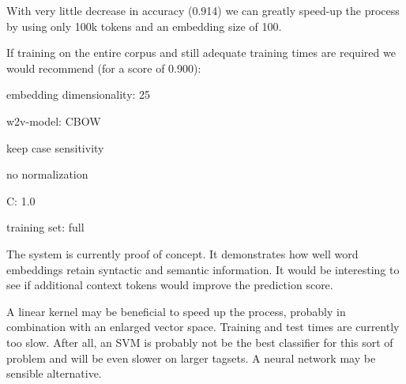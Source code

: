 \documentclass[11pt,a4paper]{article}
\begin{document}
With very little decrease in accuracy (0.914) we can greatly speed-up the process by using only 100k tokens and an embedding size of 100.

If training on the entire corpus and still adequate training times are required we would recommend (for a score of 0.900):
\begin{itemize*}
	\item embedding dimensionality: 25
	\item w2v-model: CBOW
	\item keep case sensitivity
	\item no normalization
	\item C: 1.0
	\item training set: full
\end{itemize*}

The system is currently proof of concept. It demonstrates how well word embeddings retain syntactic and semantic information. It would be interesting to see if additional context tokens would improve the prediction score.

A linear kernel may be beneficial to speed up the process, probably in combination with an enlarged vector space. Training and test times are currently too slow. After all, an SVM is probably not be the best classifier for this sort of problem and will be even slower on larger tagsets. A neural network may be sensible alternative.


%
%


\end{document}
